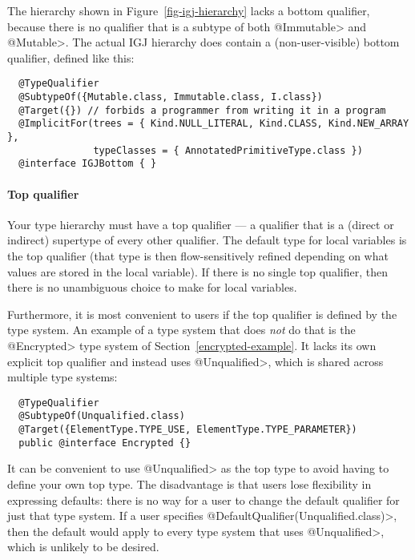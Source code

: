 The hierarchy shown in Figure~\ref{fig-igj-hierarchy} lacks
a bottom qualifier, because there is no qualifier that is a subtype of both
\<@Immutable> and \<@Mutable>.
The actual IGJ hierarchy does contain a (non-user-visible) bottom qualifier,
defined like this:

\begin{Verbatim}
  @TypeQualifier
  @SubtypeOf({Mutable.class, Immutable.class, I.class})
  @Target({}) // forbids a programmer from writing it in a program
  @ImplicitFor(trees = { Kind.NULL_LITERAL, Kind.CLASS, Kind.NEW_ARRAY },
               typeClasses = { AnnotatedPrimitiveType.class })
  @interface IGJBottom { }
\end{Verbatim}


\paragraph{Top qualifier\label{top-qualifier}}
Your type hierarchy must have a top qualifier
--- a qualifier that is a (direct or indirect) supertype of every other
qualifier.
The default type for local variables is the top
qualifier (that type is then flow-sensitively
refined depending on what values are stored in the local variable).
If there is no single top qualifier, then there is no
unambiguous choice to make for local variables.

Furthermore, it is most convenient to users if the top qualifier is defined
by the type system.  An example of a type system that does
\emph{not} do that is the \<@Encrypted> type system of
Section~\ref{encrypted-example}.  It lacks its own explicit top qualifier and instead
uses \<@Unqualified>, which is shared across multiple type systems:

\begin{Verbatim}
  @TypeQualifier
  @SubtypeOf(Unqualified.class)
  @Target({ElementType.TYPE_USE, ElementType.TYPE_PARAMETER})
  public @interface Encrypted {}
\end{Verbatim}


\noindent
It can be convenient to use \<@Unqualified> as the top type to avoid
having to define your own top type.  The disadvantage is that users lose
flexibility in expressing defaults:  there is no
way for a user to change the default qualifier for just that type system.
If a user specifies
\<@DefaultQualifier(Unqualified.class)>,
then the default would apply to every
type system that uses \<@Unqualified>, which is unlikely to be desired.


